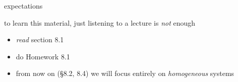 \documentclass[dvipsnames,colorlinks]{beamer}
\begin{document}
\begin{frame}{expectations}

to learn this material, just listening to a lecture is \emph{not} enough
     \begin{itemize}
     \item \emph{read} section 8.1
     \item do Homework 8.1
     \item from now on (\S 8.2, 8.4) we will focus entirely on \emph{homogeneous} systems
     \end{itemize}
\end{frame}
\end{document}
